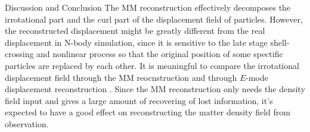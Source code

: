 \begin{section}{Discussion and Conclusion}
   The MM reconstruction effectively decomposes the irrotational part and the curl part of the displacement 
field of particles. However, the reconstructed displacement might be greatly different from the real displacement in N-body 
simulation, since it is sensitive to the late stage shell-crossing and nonlinear process so that the original 
position of some spectific particles are replaced by each other. It is meaningful to compare the irrotational 
displacement field through the MM reocnstruction and through $E$-mode displacement reconstruction \cite{bib:Yu2016}.  
Since the MM reconstruction only needs the density field input and gives a large amount of recovering of lost information, 
it's expected to have a good effect on reconstructing the matter density field from observation.
\end{section}
